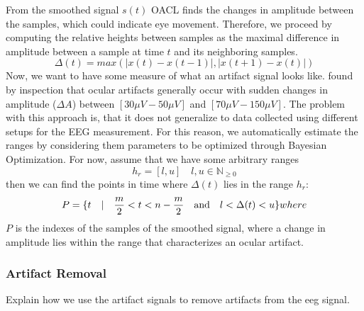 From the smoothed signal $s(t)$ OACL finds the changes in amplitude between the samples, which could indicate eye movement. Therefore, we proceed by computing the relative heights between samples as the maximal difference in amplitude between a sample at time $t$ and its neighboring samples.
\begin{equation}
\label{eq:relheights}
\Delta (t) = max(|x(t)-x(t-1)|,|x(t+1) - x(t)|)
\end{equation}
Now, we want to have some measure of what an artifact signal looks like. \citet{li2015ocular} found by inspection that ocular artifacts generally occur with sudden changes in amplitude ($\Delta A$) between $[30\mu V-50\mu V]$ and $[70\mu V-150\mu V]$. The problem with this approach is, that it does not generalize to data collected using different setups for the EEG measurement. For this reason, we automatically estimate the ranges by considering them parameters to be optimized through Bayesian Optimization.
For now, assume that we have some arbitrary ranges
\begin{equation}
\label{eq:ranges}
h_r=[l, u] \quad  l,u \in \mathbb{N}_{\geq 0}
\end{equation}
then we can find the points in time where $\Delta (t)$  lies in the range $h_r$:
\begin{equation}
\label{eq:peaks}
P = \{t \quad | \quad \frac{m}{2} < t < n-\frac{m}{2} \quad \textnormal{and} \quad l < \Delta (t) < u\}
where 
\end{equation}
 $P$ is the indexes of the samples of the smoothed signal, where a change in amplitude lies within the range that characterizes an ocular artifact.
\subsubsection{Artifact Removal}
Explain how we use the artifact signals to remove artifacts from the eeg signal.